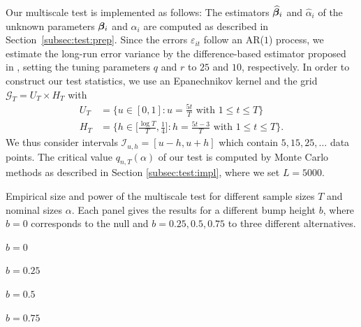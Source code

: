 \documentclass[12pt]{article}
\begin{document}
Our multiscale test is implemented as follows: The estimators $\widehat{\bm{\beta}}_i$ and $\widehat{\alpha}_i$ of the unknown parameters $\bm{\beta}_i$ and $\alpha_i$ are computed as described in Section~\ref{subsec:test:prep}. Since the errors $\varepsilon_{it}$ follow an AR($1$) process, we estimate the long-run error variance by the difference-based estimator proposed in \cite{KhismatullinaVogt2020}, setting the tuning parameters $q$ and $r$ to $25$ and $10$, respectively. In order to construct our test statistics, we use an Epanechnikov kernel and the grid $\mathcal{G}_T = U_T \times H_T$ with
\begin{align}
U_T & = \big\{ u \in [0,1]: u = \textstyle{\frac{5t}{T}} \text{ with } 1 \le t \le T \big\} \label{eq:grid-loc} \\
H_T & = \big\{ h \in \big[ \textstyle{\frac{\log T}{T}}, \textstyle{\frac{1}{4}} \big]:  h = \textstyle{\frac{5 t -3}{T}} \text{ with } 1 \le t \le T \big\}. \label{eq:grid-scale}
\end{align}
We thus consider intervals $\mathcal{I}_{u, h} = [u-h, u+h]$ which contain $5, 15, 25, \ldots$ data points. The critical value $q_{n,T}(\alpha)$ of our test is computed by Monte Carlo methods as described in Section \ref{subsec:test:impl}, where we set $L=5000$. 


\begin{table}[t!]
\renewcommand{\arraystretch}{1.2}  
\footnotesize{
\begin{center}
\caption{Empirical size and power of the multiscale test for different sample sizes $T$ and nominal sizes $\alpha$.
Each panel gives the results for a different bump height $b$, where $b = 0$ corresponds to the null and $b = 0.25,0.5,0.75$ to three different alternatives.}\label{tab:sizepower}
{\color{red}\begin{subtable}[b]{0.4\textwidth}
\centering  
\caption{$b=0$}

\end{subtable}
\begin{subtable}[b]{0.4\textwidth}
\centering  
\caption{$b=0.25$}

\end{subtable}
\begin{subtable}[b]{0.4\textwidth}
\centering  
\vspace{0.25cm} \caption{$b=0.5$}

\end{subtable}
\begin{subtable}[b]{0.4\textwidth}
\centering  
\vspace{0.25cm} \caption{$b=0.75$}

\end{subtable}}
\end{center}}
\end{table}
\end{document}
